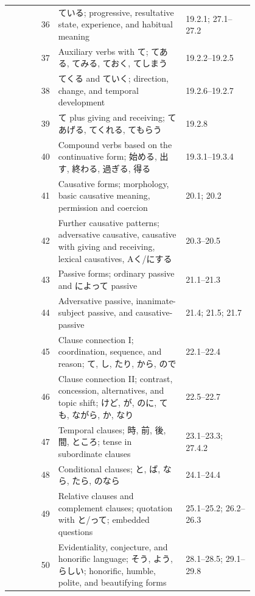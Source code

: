 \documentclass[12pt]{nextbook_zh}
\begin{document}
{\begin{longtable}{r p{0.52\linewidth} p{0.28\linewidth}}
36 & ている; progressive, resultative state, experience, and habitual meaning & 19.2.1; 27.1--27.2 \\
37 & Auxiliary verbs with て; てある, てみる, ておく, てしまう & 19.2.2--19.2.5 \\
38 & てくる and ていく; direction, change, and temporal development & 19.2.6--19.2.7 \\
39 & て plus giving and receiving; てあげる, てくれる, てもらう & 19.2.8 \\
40 & Compound verbs based on the continuative form; 始める, 出す, 終わる, 過ぎる, 得る & 19.3.1--19.3.4 \\
41 & Causative forms; morphology, basic causative meaning, permission and coercion & 20.1; 20.2 \\
42 & Further causative patterns; adversative causative, causative with giving and receiving, lexical causatives, Aく/にする & 20.3--20.5 \\
43 & Passive forms; ordinary passive and によって passive & 21.1--21.3 \\
44 & Adversative passive, inanimate-subject passive, and causative-passive & 21.4; 21.5; 21.7 \\
45 & Clause connection I; coordination, sequence, and reason; て, し, たり, から, ので & 22.1--22.4 \\
46 & Clause connection II; contrast, concession, alternatives, and topic shift; けど, が, のに, ても, ながら, か, なり & 22.5--22.7 \\
47 & Temporal clauses; 時, 前, 後, 間, ところ; tense in subordinate clauses & 23.1--23.3; 27.4.2 \\
48 & Conditional clauses; と, ば, なら, たら, のなら & 24.1--24.4 \\
49 & Relative clauses and complement clauses; quotation with と/って; embedded questions & 25.1--25.2; 26.2--26.3 \\
50 & Evidentiality, conjecture, and honorific language; そう, よう, らしい; honorific, humble, polite, and beautifying forms & 28.1--28.5; 29.1--29.8 \\

\end{longtable}
}
\tableofcontents
\mainmatter
\end{document}
